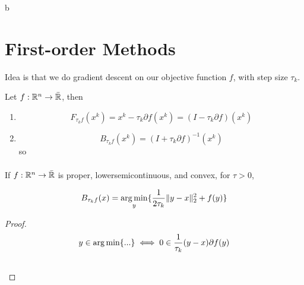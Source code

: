 b\chapter{First-order Methods}
\label{cha:first-order-methods}

Idea is that we do gradient descent on our objective function $f$,
with step size $\tau_{k}$.

\begin{defn}
  \label{defn:first_order_methods:1}
  Let $f: \mathbb{R}^{n} \rightarrow \bar {\mathbb{R}}$, then
  \begin{enumerate}
  \item
    \begin{equation}
      \label{eq:1}
      F_{\tau_{k}f}(x^{k}) = x^{k} - \tau_{k} \partial f(x^{k}) = (I -
      \tau_{k} \partial f)(x^{k})
    \end{equation}
  \item
    \begin{equation}
      \label{eq:2}
      B_{\tau_{k} f}(x^{k}) = (I + \tau_{k} \partial f)^{-1}(x^{k})
    \end{equation} so
    \begin{align}
      \label{eq:3}
    \end{align} 
  \end{enumerate}
\end{defn}

\begin{proposition}
  If $f: \mathbb{R}^{n} \rightarrow \bar {\mathbb{R}}$ is proper, lowersemicontinuous,
  and convex, for $\tau > 0$, 

  \begin{equation}
    \label{eq:62}
    B_{\tau_{k} f}(x) = \operatorname*{arg\,min}_{y} \{
    \frac{1}{2\tau_{k}} \| y - x \|_{2}^{2} + f(y) \}
  \end{equation}
\end{proposition}

\begin{proof}
  \begin{align}
    \label{eq:72}
    y \in \operatorname*{arg\,min} \{ ... \} &\iff 0 \in \frac{1}{\tau_{k}}(y -x
    ) \partial f(y) \\
    &\
  \end{align}
\end{proof}


